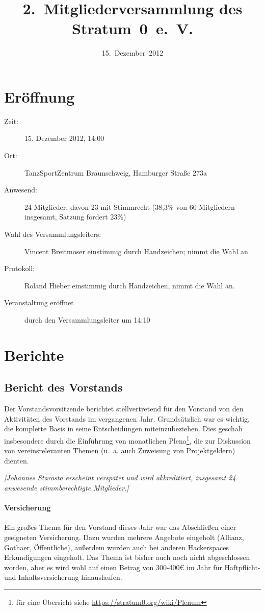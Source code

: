 \documentclass[a4paper,12pt]{scrartcl}
\title{2.~Mitgliederversammlung des Stratum~0~e.~V.}
\date{15.~Dezember~2012}
\begin{document}
\maketitle
{\footnotesize\tableofcontents}

\section{Eröffnung}
\begin{description}
  \item[Zeit:] 15. Dezember 2012, 14:00
  \item[Ort:] TanzSportZentrum Braunschweig, Hamburger Straße 273a
  \item[Anwesend:] 24 Mitglieder, davon 23 mit Stimmrecht (38{,}3\% von 60
    Mitgliedern insgesamt, Satzung fordert 23\%)
  \item[Wahl des Versammlungsleiters:] Vincent Breitmoser einstimmig durch
    Handzeichen; nimmt die Wahl an
  \item[Protokoll:] Roland Hieber einstimmig durch Handzeichen, nimmt die Wahl
    an.
  \item[Veranstaltung eröffnet] durch den Versammlungsleiter um 14:10
\end{description}

\section{Berichte}
\subsection{Bericht des Vorstands}
Der Vorstandsvorsitzende berichtet stellvertretend für den Vorstand von den
Aktivitäten des Vorstands im vergangenen Jahr. Grundsätzlich war es wichtig, die
komplette Basis in seine Entscheidungen miteinzubeziehen. Dies geschah
insbesondere durch die Einführung von monatlichen Plena\footnote{für eine
Übersicht siehe \url{https://stratum0.org/wiki/Plenum}}, die zur Diskussion von
vereinsrelevanten Themen (u.~a. auch Zuweisung von Projektgeldern) dienten.

\emph{[Johannes Starosta erscheint verspätet und wird akkreditiert, insgesamt 24
anwesende stimmberechtigte Mitglieder.]}

\paragraph{Versicherung}
Ein großes Thema für den Vorstand dieses Jahr war das Abschließen einer
geeigneten Versicherung. Dazu wurden mehrere Angebote eingeholt (Allianz,
Gothaer, Öffentliche), außerdem wurden auch bei anderen Hackerspaces
Erkundigungen eingeholt. Das Thema ist bisher auch noch nicht abgeschlossen
worden, aber es wird wohl auf einen Betrag von 300-400€ im Jahr für Haftpflicht-
und Inhaltsversicherung hinauslaufen.
\end{document}
